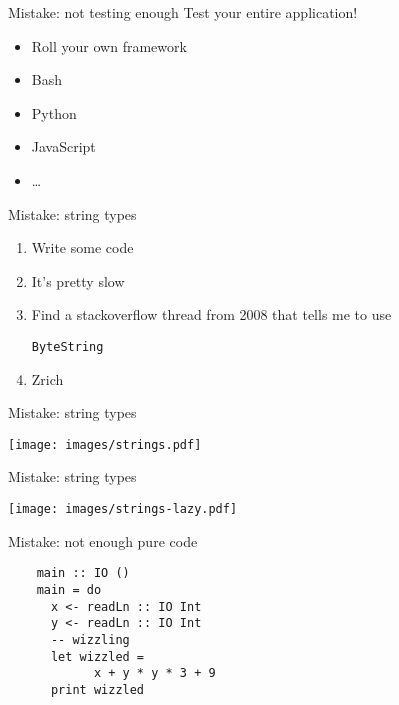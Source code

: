 \documentclass[20pt]{beamer}
\newcommand{\vspaced}{
    \vspace{5mm}
}
\newcommand{\code}[1]{
    \texttt{\small{#1}}
}
\begin{document}
\begin{frame}{Mistake: not testing enough}
    Test your entire application! \\
    \vspaced
    \begin{itemize}
    \item Roll your own framework
    \item Bash
    \item Python
    \item JavaScript
    \item \ldots
    \end{itemize}
\end{frame}


\begin{frame}{Mistake: string types}
    \begin{enumerate}
    \item Write some code
    \item It's pretty slow
    \item Find a stackoverflow thread from 2008 that tells me to use
        \code{ByteString}
    \item Zrich
    \end{enumerate}
\end{frame}

\begin{frame}{Mistake: string types}
    \begin{center}
    \texttt{[image: images/strings.pdf]}
    \end{center}
\end{frame}

\begin{frame}{Mistake: string types}
    \begin{center}
    \texttt{[image: images/strings-lazy.pdf]}
    \end{center}
\end{frame}


\begin{frame}[fragile]{Mistake: not enough pure code}
    \begin{lstlisting}
    main :: IO ()
    main = do
      x <- readLn :: IO Int
      y <- readLn :: IO Int
      -- wizzling
      let wizzled =
            x + y * y * 3 + 9
      print wizzled
    \end{lstlisting}
\end{frame}
\end{document}
